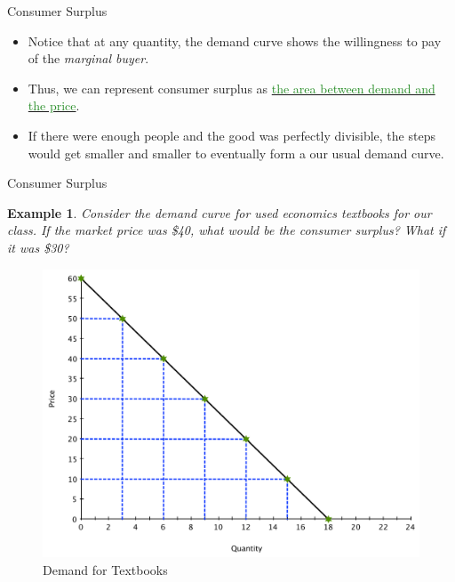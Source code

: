 \documentclass[xcolor={dvipsnames},pdf, hyperref={colorlinks=true, citecolor=ForestGreen, linkcolor=BlueViolet, urlcolor=Magenta}]{beamer}
\newtheorem{exmp}{Example}[section]
\newcommand{\ddp}[1]{{\textcolor{ForestGreen}{#1}}}
\newcommand{\dd}[1]{{\underline{\textcolor{ForestGreen}{#1}}}}
\begin{document}
\begin{frame}{Consumer Surplus}
	\begin{itemize}
		\item 	Notice that at any quantity, the demand curve shows the willingness to pay of the \textit{marginal buyer}. 
		\item Thus, we can represent consumer surplus as \dd{the area between demand and the price}.
		\item If there were enough people and the good was perfectly divisible, the steps would get smaller and smaller to eventually form a our usual demand curve.
	\end{itemize}
	\end{frame}
	
\begin{frame}{Consumer Surplus}
			\begin{exmp} 	\scriptsize Consider the demand curve for used economics textbooks for our class. If the market price was \$40, what would be the consumer surplus? What if it was \$30?
			\end{exmp}
			\begin{figure}[H]
			\centering
			\includegraphics[scale=.25]{plot7.pdf}
			\caption{Demand for Textbooks}	
		\end{figure}
			\scriptsize	
		\pause 	\ddp{At \$40, CS = $(1/2)(20)(6) = \$60$. \\
			\pause At \$30, CS=$(1/2)(30)(9) = \$135$.}
\end{frame}
	
\end{document}
